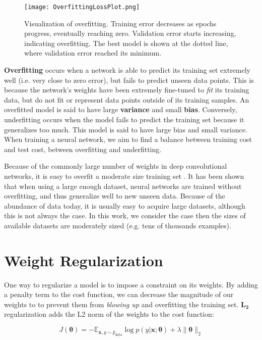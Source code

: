 \begin{figure}[h]
\centering
\texttt{[image: OverfittingLossPlot.png]}
\caption{Visualization of overfitting. Training error decreases as epochs progress, eventually reaching zero.
Validation error starts increasing, indicating overfitting. The best model is shown at the dotted line, where
validation error reached its minimum.}

\end{figure}

\textbf{Overfitting} occurs when a network is able to predict its training set extremely well (i.e. very close to zero error), but fails to predict
unseen data points. This is because the network's weights have been extremely fine-tuned to \textit{fit} its training data, but do not fit or represent
data points outside of its training samples.
An overfitted model is said to have large \textbf{variance} and small \textbf{bias}. Conversely, underfitting occurs when the model fails to predict
the training set because it generalizes too much. This model is said to have large bias and small variance. When training a neural network,
we aim to find a balance between training cost and test cost, between overfitting and underfitting.

Because of the commonly large number of weights in deep convolutional networks, it is easy to overfit a moderate size training set \cite{hinton2012improving}.
It has been shown that when using a large enough dataset, neural networks are trained without overfitting, and thus generalize well
to new unseen data. Because of the abundance of data today, it is usually easy to acquire large datasets, although this is not always the case.
In this work, we consider the case then the sizes of available datasets are moderately sized (e.g. tens of thousands examples).

\section{Weight Regularization}
One way to regularize a model is to impose a constraint on its weights. By adding a penalty term to the cost function, we can decrease the
magnitude of our weights to to prevent them from \textit{blowing up} and overfitting the training set. $\bm{L_2}$ regularization
adds the L2 norm of the weights to the cost function:

\[J(\bm{\theta}) = -\mathbb{E}_{\bm{x},y \sim \hat p_{data}} \log \textit{p}(y|\bm{x};\bm{\theta}) + \lambda \lVert \bm{\theta} \rVert_{2}\]

